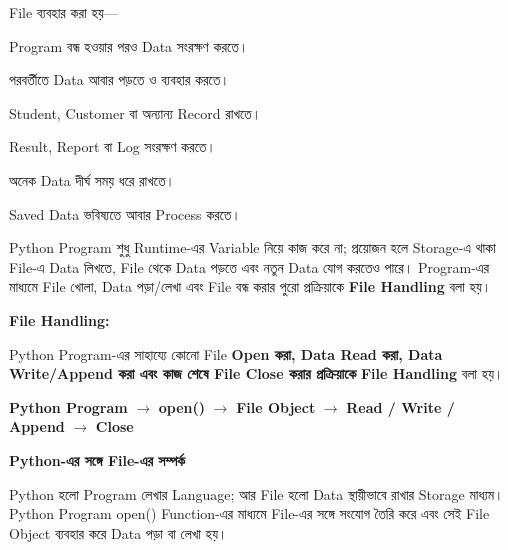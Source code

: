 

File ব্যবহার করা হয়—

\begin{compacttwocolpoints}

\item Program বন্ধ হওয়ার পরও Data সংরক্ষণ করতে।

\item পরবর্তীতে Data আবার পড়তে ও ব্যবহার করতে।

\item Student, Customer বা অন্যান্য Record রাখতে।

\item Result, Report বা Log সংরক্ষণ করতে।

\item অনেক Data দীর্ঘ সময় ধরে রাখতে।

\item Saved Data ভবিষ্যতে আবার Process করতে।

\end{compacttwocolpoints}


Python Program শুধু Runtime-এর Variable নিয়ে কাজ করে না; প্রয়োজন হলে
Storage-এ থাকা File-এ Data লিখতে, File থেকে Data পড়তে এবং নতুন Data
যোগ করতেও পারে। Program-এর মাধ্যমে File খোলা, Data পড়া/লেখা এবং
File বন্ধ করার পুরো প্রক্রিয়াকে \textbf{File Handling} বলা হয়।

\begin{definitionbox}
\textbf{\color{darkTeal}File Handling:}

Python Program-এর সাহায্যে কোনো File \textbf{Open করা, Data Read করা,
Data Write/Append করা এবং কাজ শেষে File Close করার প্রক্রিয়াকে}
\textbf{File Handling} বলা হয়।
\end{definitionbox}

\begin{center}
\textbf{Python Program}
\(\longrightarrow\)
\textbf{\textenglish{\ttfamily open()}}
\(\longrightarrow\)
\textbf{File Object}
\(\longrightarrow\)
\textbf{Read / Write / Append}
\(\longrightarrow\)
\textbf{Close}
\end{center}

\begin{rememberbox}
\textbf{\color{deepOrange}Python-এর সঙ্গে File-এর সম্পর্ক}

Python হলো Program লেখার Language; আর File হলো Data স্থায়ীভাবে রাখার
Storage মাধ্যম। Python Program \textenglish{\ttfamily open()} Function-এর
মাধ্যমে File-এর সঙ্গে সংযোগ তৈরি করে এবং সেই File Object ব্যবহার করে
Data পড়া বা লেখা হয়।
\end{rememberbox}


